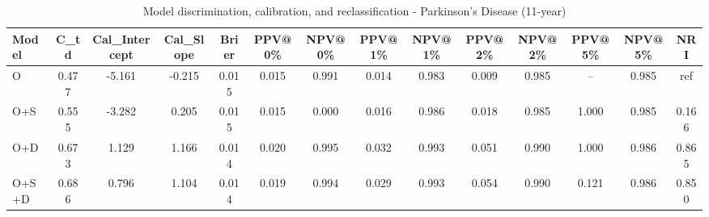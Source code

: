 \begin{table}[htbp]
\centering
\small
\caption{Model discrimination, calibration, and reclassification - Parkinson's Disease (11-year)}
\label{tab:perf_pd_11y}
\begin{tabular}{lccccccccccccc}
\toprule
Model & C\_td & Cal\_Intercept & Cal\_Slope & Brier & PPV@0\% & NPV@0\% & PPV@1\% & NPV@1\% & PPV@2\% & NPV@2\% & PPV@5\% & NPV@5\% & NRI \\
\midrule
O & 0.477 & -5.161 & -0.215 & 0.015 & 0.015 & 0.991 & 0.014 & 0.983 & 0.009 & 0.985 & -- & 0.985 & ref \\
O+S & 0.555 & -3.282 & 0.205 & 0.015 & 0.015 & 0.000 & 0.016 & 0.986 & 0.018 & 0.985 & 1.000 & 0.985 & 0.166 \\
O+D & 0.673 & 1.129 & 1.166 & 0.014 & 0.020 & 0.995 & 0.032 & 0.993 & 0.051 & 0.990 & 1.000 & 0.986 & 0.865 \\
O+S+D & 0.686 & 0.796 & 1.104 & 0.014 & 0.019 & 0.994 & 0.029 & 0.993 & 0.054 & 0.990 & 0.121 & 0.986 & 0.850 \\
\bottomrule
\end{tabular}
\end{table}